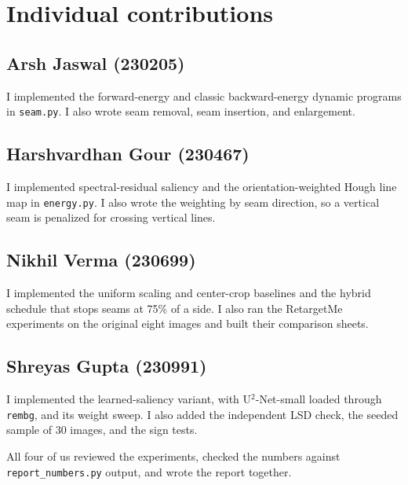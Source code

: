 \documentclass[10pt,twocolumn,letterpaper]{article}
\begin{document}
\FloatBarrier
{
\small


}

\appendix
\onecolumn

\section{Individual contributions}
\subsection{Arsh Jaswal (230205)}
I implemented the forward-energy and classic backward-energy dynamic programs in \texttt{seam.py}.
I also wrote seam removal, seam insertion, and enlargement.

\subsection{Harshvardhan Gour (230467)}
I implemented spectral-residual saliency and the orientation-weighted Hough line map in \texttt{energy.py}.
I also wrote the weighting by seam direction, so a vertical seam is penalized for crossing vertical lines.

\subsection{Nikhil Verma (230699)}
I implemented the uniform scaling and center-crop baselines and the hybrid schedule that stops seams at 75\% of a side.
I also ran the RetargetMe experiments on the original eight images and built their comparison sheets.

\subsection{Shreyas Gupta (230991)}
I implemented the learned-saliency variant, with U$^2$-Net-small loaded through \texttt{rembg}, and its weight sweep.
I also added the independent LSD check, the seeded sample of 30 images, and the sign tests.

All four of us reviewed the experiments, checked the numbers against \texttt{report\_numbers.py} output, and wrote the report together.
\end{document}
